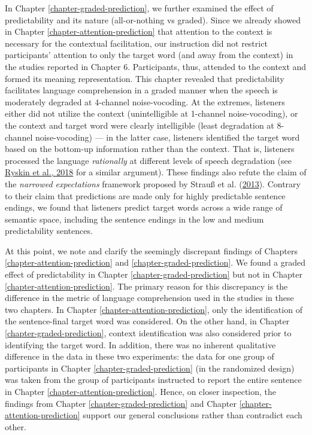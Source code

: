 \documentclass[a4paper, nobind]{templates/ociamthesis}
\begin{document}
In Chapter \ref{chapter-graded-prediction}, we further examined the effect of predictability and its nature (all-or-nothing vs graded).
Since we already showed in Chapter \ref{chapter-attention-prediction} that attention to the context is necessary for the contextual facilitation,
our instruction did not restrict participants' attention to only the target word (and away from the context) in the studies reported in Chapter 6.
Participants, thus, attended to the context and formed its meaning representation.
This chapter revealed that predictability facilitates language comprehension in a graded manner when the speech is moderately degraded at 4-channel noise-vocoding.
At the extremes, listeners either did not utilize the context (unintelligible at 1-channel noise-vocoding),
or the context and target word were clearly intelligible (least degradation at 8-channel noise-vocoding) ---
in the latter case, listeners identified the target word based on the bottom-up information rather than the context.
That is, listeners processed the language \emph{rationally} at different levels of speech degradation (see \protect\hyperlink{ref-Ryskin2018}{Ryskin et al., 2018} for a similar argument).
These findings also refute the claim of the \emph{narrowed expectations} framework proposed by Strauß et al. (\protect\hyperlink{ref-Strauss2013}{2013}).
Contrary to their claim that predictions are made only for highly predictable sentence endings,
we found that listeners predict target words across a wide range of semantic space, including the sentence endings in the low and medium predictability sentences.

At this point, we note and clarify the seemingly discrepant findings of Chapters \ref{chapter-attention-prediction} and \ref{chapter-graded-prediction}.
We found a graded effect of predictability in Chapter \ref{chapter-graded-prediction} but not in Chapter \ref{chapter-attention-prediction}.
The primary reason for this discrepancy is the difference in the metric of language comprehension used in the studies in these two chapters.
In Chapter \ref{chapter-attention-prediction}, only the identification of the sentence-final target word was considered.
On the other hand, in Chapter \ref{chapter-graded-prediction}, context identification was also considered prior to identifying the target word.
In addition, there was no inherent qualitative difference in the data in these two experiments:
the data for one group of participants in Chapter \ref{chapter-graded-prediction} (in the randomized design) was taken from the group of participants instructed to report the entire sentence in Chapter \ref{chapter-attention-prediction}.
Hence, on closer inspection, the findings from Chapter \ref{chapter-graded-prediction} and Chapter \ref{chapter-attention-prediction} support our general conclusions rather than contradict each other.
\end{document}
